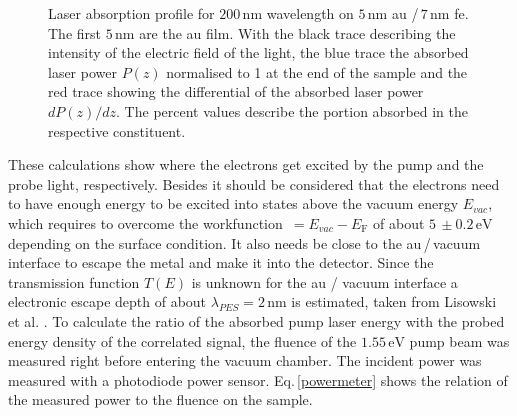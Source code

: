\documentclass[a4paper,12pt,twoside]{article}
\begin{document}
	\begin{figure}[H]
		\caption{Laser absorption profile for $200\,\mathrm{nm}$ wavelength on $5\,\mathrm{\mbox{nm}}$ \gls{au} /\,$7\,\mathrm{\mbox{nm}}$ \gls{fe}. The first $5\,\mathrm{nm}$ are the \gls{au} film. With the black trace describing the intensity of the electric field of the light, the blue trace the absorbed laser power $P(z)$ normalised to 1 at the end of the sample and the red trace showing the differential of the absorbed laser power $dP(z)/dz$. The percent values describe the portion absorbed in the respective constituent.}
		    \label{5nmProbelaser}
	\end{figure}
These calculations show where the electrons get excited by the pump and the probe light, respectively. Besides it should be considered that the electrons need to have enough energy to be excited into states above the vacuum energy $E_{vac}$, which requires to overcome the workfunction \textTheta\,$ = E_{vac} - E_{\mathrm{F}}$ of about $5\,\pm0.2\,\mathrm{\mbox{eV}}$ depending on the surface condition. It also needs be close to the \gls{au}\,/\,vacuum interface to escape the metal and make it into the detector. Since the transmission function $T(E)$ is unknown for the \gls{au} / vacuum interface a electronic escape depth of about $\lambda_{PES} = 2\,\mathrm{nm}$ is estimated, taken from Lisowski et al. \cite{Lisowski2004}.
To calculate the ratio of the absorbed pump laser energy with the probed energy density of the correlated signal, the fluence of the $1.55\,\mathrm{\mbox{eV}}$ pump beam was measured right before entering the vacuum chamber. The incident power was measured with a photodiode power sensor. Eq.\,\ref{powermeter} shows the relation of the measured power to the fluence on the sample.\\
\end{document}
